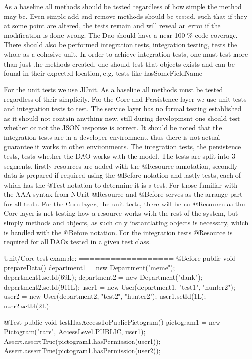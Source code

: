 
As a baseline all methods should be tested regardless of how simple the method may be.
Even simple add and remove methods should be tested, such that if they at some point are altered, the tests remain and will reveal an error if the modification is done wrong.
The Dao should have a near 100 \% code coverage.
There should also be performed integration tests, integration testing, tests the whole as a cohesive unit.
In order to achieve integration tests, one must test more than just the methods created, one should test that objects exists and can be found in their expected location, e.g. tests like hasSomeFieldName

For the unit tests we use JUnit.
As a baseline all methods must be tested regardless of their simplicity.
For the Core and Persistence layer we use unit tests and integration tests to test.
The service layer has no formal testing established as it should not contain anything new, still during development one should test whether or not the JSON response is correct.
It should be noted that the integration tests are in a developer environment, thus there is not actual guarantee it works in other environments.
The integration tests, the persistence tests, tests whether the DAO works with the model.
The tests are split into 3 segments, firstly resources are added with the @Resource annotation, secondly data is prepared if required using the @Before notation and lastly tests, each of which has the @Test notation to determine it is a test.
For those familiar with the AAA syntax from NUnit @Resource and @Before serves as the arrange part for all tests.
For the Core layer, the unit tests, there will be no @Resource as the Core layer is not testing how a resource works with the rest of the system, but simply methods and objects, as such only instantiating objects is necessary, which is handled with the @Before notation.
For the integration tests @Resource is required for all DAOs tested in a given test class.

Unit/Core test example:
==================
@Before
    public void prepareData(){
        department1 = new Department("meme");
        department1.setId(69L);
        department2 = new Department("dank");
        department2.setId(911L);
        user1 = new User(department1, "test1", "hunter2");
        user2 = new User(department2, "test2", "hunter2");
        user1.setId(1L);
        user2.setId(2L);
    }

    @Test
    public void testHasAccessToPublicPictogram(){
        pictogram1 = new Pictogram("rare", AccessLevel.PUBLIC, user1);
        Assert.assertTrue(pictogram1.hasPermission(user1));
        Assert.assertTrue(pictogram1.hasPermission(user2));
    }

